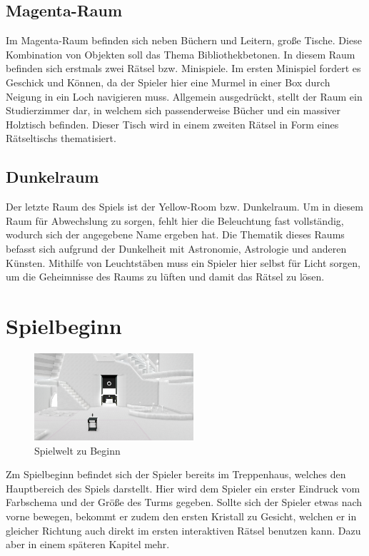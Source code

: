 \subsection{Magenta-Raum}
Im Magenta-Raum befinden sich neben Büchern und Leitern, große Tische. Diese Kombination von Objekten soll das Thema \dq Bibliothek\dq betonen. In diesem Raum befinden sich erstmals zwei Rätsel bzw. Minispiele. Im ersten Minispiel fordert es Geschick und Können, da der Spieler hier eine Murmel in einer Box durch Neigung in ein Loch navigieren muss. Allgemein ausgedrückt, stellt der Raum ein Studierzimmer dar, in welchem sich passenderweise Bücher und ein massiver Holztisch befinden. Dieser Tisch wird in einem zweiten Rätsel in Form eines Rätseltischs thematisiert.
\subsection{Dunkelraum}
Der letzte Raum des Spiels ist der Yellow-Room bzw. Dunkelraum. Um in diesem Raum für Abwechslung zu sorgen, fehlt hier die Beleuchtung fast vollständig, wodurch sich der angegebene Name ergeben hat. Die Thematik dieses Raums befasst sich aufgrund der Dunkelheit mit Astronomie, Astrologie und anderen Künsten. Mithilfe von Leuchtstäben muss ein Spieler hier selbst für Licht sorgen, um die Geheimnisse des Raums zu lüften und damit das Rätsel zu lösen.

\newpage
\noindent
\section{Spielbeginn}
\begin{figure}
	\vspace*{-0.5cm}
	\includegraphics[width=5.9cm]{Pictures/Lobby_Start}
	\caption{Spielwelt zu Beginn}
	\vspace*{-0.5cm}
	\label{fig:spielwelt-beginn}
\end{figure}
Zm Spielbeginn befindet sich der Spieler bereits im Treppenhaus, welches den Hauptbereich des Spiels darstellt. Hier wird dem Spieler ein erster Eindruck vom Farbschema und der Größe des Turms gegeben. Sollte sich der Spieler etwas nach vorne bewegen, bekommt er zudem den ersten Kristall zu Gesicht, welchen er in gleicher Richtung auch direkt im ersten interaktiven Rätsel benutzen kann. Dazu aber in einem späteren Kapitel mehr.\\
